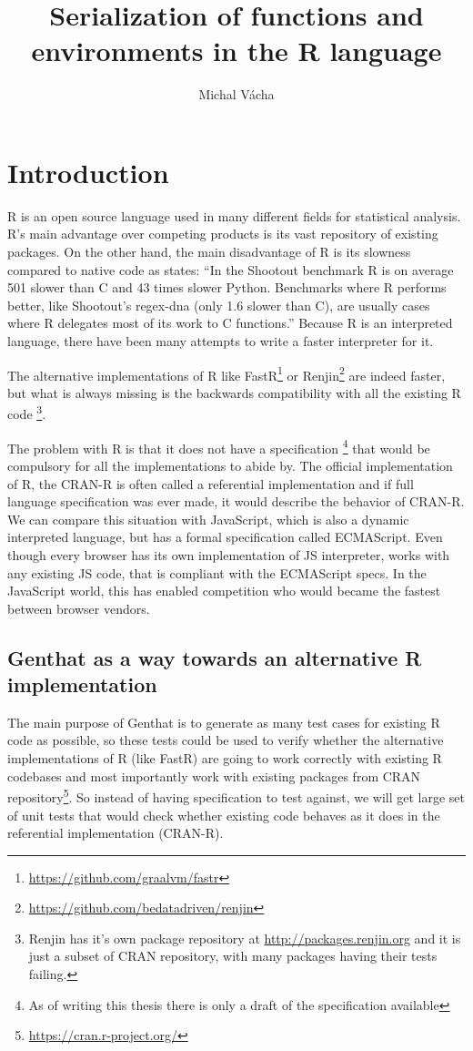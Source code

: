 \documentclass[thesis=B,english]{FITthesis}[2012/10/20]
\title{Serialization of functions and environments in the R language}
\author{Michal Vácha} %
\begin{document}

\chapter{Introduction}


R is an open source language used in many different fields for statistical analysis. R’s main advantage over competing products is its vast repository of existing packages. On the other hand, the main disadvantage of R is its slowness compared to native code as \cite{vitek} states: ``In the Shootout benchmark R is on average 501 slower than C and 43 times slower Python. Benchmarks where R performs better, like Shootout’s regex-dna (only 1.6 slower than C), are usually cases where R delegates most of its work to C functions.'' Because R is an interpreted language, there have been many attempts to write a faster interpreter for it.

The alternative implementations of R like FastR\footnote{\url{https://github.com/graalvm/fastr}} or Renjin\footnote{\url{https://github.com/bedatadriven/renjin}} are indeed faster\cite{renjin}, but what is always missing is the backwards compatibility with all the existing R code \footnote{Renjin has it's own package repository at \url{http://packages.renjin.org} and it is just a subset of CRAN repository, with many packages having their tests failing.}. 

The problem with R is that it does not have a specification \footnote{As of writing this thesis there is only a draft of the specification available} that would be compulsory for all the implementations to abide by. The official implementation of R, the CRAN-R is often called a referential implementation and if full language specification was ever made, it would describe the behavior of CRAN-R. We can compare this situation with JavaScript, which is also a dynamic interpreted language, but has a formal specification called ECMAScript\cite{EcmaScript}. Even though every browser has its own implementation of JS interpreter, works with any existing JS code, that is compliant with the ECMAScript specs. In the JavaScript world, this has enabled competition who would became the fastest between browser vendors. 

\section{Genthat as a way towards an alternative R implementation}
The main purpose of Genthat is to generate as many test cases for existing R code as possible, so these tests could be used to verify whether the alternative implementations of R (like FastR) are going to work correctly with existing R codebases and most importantly work with existing packages from CRAN repository\footnote{\url{https://cran.r-project.org/}}. \cite{testRPoster} So instead of having specification to test against, we will get large set of unit tests that would check whether existing code behaves as it does in the referential implementation (CRAN-R).
\end{document}
